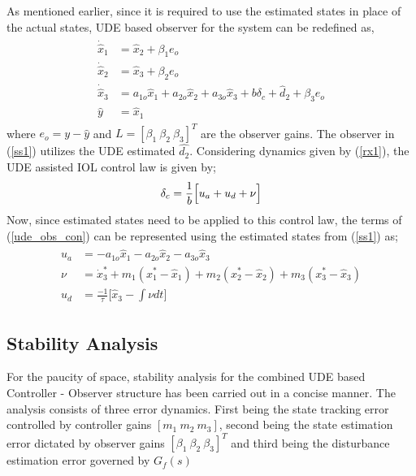 \documentclass[conference]{IEEEtran}
\begin{document}
		As mentioned earlier, since it is required to use the estimated states in place of the actual states, UDE based observer for the system can be redefined as,
		\begin{eqnarray}
			\begin{aligned}
				\dot{\hat{x}}_1 &= \hat{x}_2 + \beta_1 e_o\\
				\dot{\hat{x}}_2 &= \hat{x}_3 + \beta_2 e_o\\
				\dot{\hat{x}}_3 &= a_{1o}\hat{x}_1 + a_{2o}\hat{x}_2 + a_{3o}\hat{x}_3 + b \delta_c + \hat{d}_2 + \beta_3 e_o\\		
				\hat{y} &= \hat{x}_1 \label{ss1}
			\end{aligned}
		\end{eqnarray}
		where $e_o = y - \hat{y}$ and $L = [\beta_1\ \beta_2\ \beta_3]^T$ are the observer gains. The observer in (\ref{ss1}) utilizes the UDE estimated $\hat{d_2}$. Considering dynamics given by (\ref{rx1}), the UDE assisted IOL control law is given by;
		\begin{equation}
				\delta_c = \frac{1}{b}\Big[u_a+u_d+\nu\Big] \\ \label{ude_obs_con}
		\end{equation}
		Now, since estimated states need to be applied to this control law, the terms of (\ref{ude_obs_con}) can be represented using the estimated states from (\ref{ss1}) as; 		
		\begin{eqnarray}
			\begin{aligned}
				u_a &= -a_{1o}\hat{x}_1 - a_{2o}\hat{x}_2 - a_{3o}\hat{x}_3 \\
				\nu &= \dot{x}^\ast_3+m_1(x^\ast_1-\hat{x}_1) + m_2(x^\ast_2-\hat{x}_2) + m_3(x^\ast_3-\hat{x}_3) \\
				u_d &= \frac{-1}{\tau}\Big[\hat{x}_3-\int{\nu dt}\Big] \label{ud} \nonumber
			\end{aligned}
		\end{eqnarray}
							
	\subsection{Stability Analysis}
		For the paucity of space, stability analysis for the combined UDE based Controller - Observer structure has been carried out in a concise manner. The analysis consists of three error dynamics. First being the state tracking error controlled by controller gains $[m_1~m_2~m_3]$, second being the state estimation error dictated by observer gains $[\beta_1\ \beta_2\ \beta_3]^T$ and third being the disturbance estimation error governed by $G_f(s)$ 
		
\end{document}
